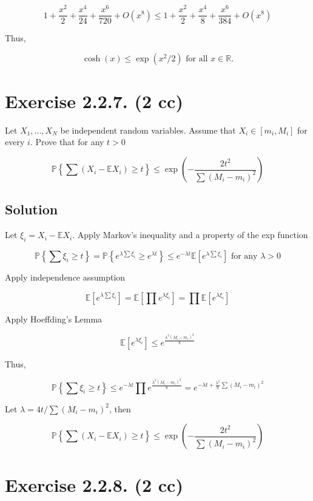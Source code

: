 \documentclass{article}
\begin{document}
$$1 + \frac{x^2}{2} + \frac{x^4}{24} + \frac{x^6}{720} + O(x^8) \leq 1 + \frac{x^2}{2} + \frac{x^4}{8} + \frac{x^6}{384} + O(x^8)$$

Thus,

$$\cosh(x) \leq \exp(x^2/2) \text{ for all } x \in \mathbb R.$$

\section{Exercise 2.2.7. (2 cc)}

Let $X_1 , . . . , X_N$ be independent random variables. Assume that $X_i \in [m_i , M_i ]$ for every $i$. Prove that for any $t > 0$

$$\mathbb P \left\{ \sum (X_i - \mathbb E X_i) \geq t \right\} \leq \exp\left( -\frac{2t^2}{\sum(M_i - m_i)^2}\right)$$

\subsection{Solution}

Let $\xi_i = X_i - \mathbb E X_i$. Apply Markov's inequality and a property of the exp function

$$\mathbb P \left\{ \sum \xi_i \geq t \right\} = \mathbb P \left\{ e^{\lambda \sum \xi_i} \geq e^{\lambda t} \right\} \leq e^{-\lambda t} \mathbb E \left[ e^{\lambda \sum \xi_i}\right]  \text{ for any } \lambda > 0 $$

Apply independence assumption

$$\mathbb E \left[ e^{\lambda \sum \xi_i}\right] = \mathbb E \left[ \prod e^{\lambda \xi_i}\right] = \prod \mathbb E \left[ e^{\lambda \xi_i}\right]$$

Apply Hoeffding's Lemma

$$\mathbb E \left[ e^{\lambda \xi_i}\right] \leq e^{\frac{\lambda^2(M_i - m_i)^2}{8}}$$

Thus,

$$\mathbb P \left\{ \sum \xi_i \geq t \right\} \leq e^{-\lambda t} \prod e^{\frac{\lambda^2(M_i - m_i)^2}{8}} = e^{-\lambda t + \frac{\lambda^2}{8}\sum (M_i - m_i)^2}$$

Let $\lambda = 4t/\sum(M_i - m_i)^2$, then

$$\mathbb P \left\{ \sum (X_i - \mathbb E X_i) \geq t \right\} \leq \exp\left( -\frac{2t^2}{\sum(M_i - m_i)^2}\right)$$

\section{Exercise 2.2.8. (2 cc)}
\end{document}
